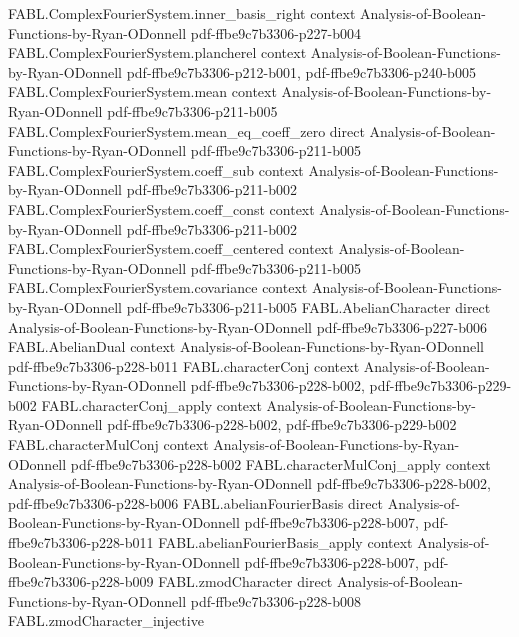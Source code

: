 \begin{theorem}
\proofstep
  {FABL.ComplexFourierSystem.inner_basis_right}
  {context}
  {Analysis-of-Boolean-Functions-by-Ryan-ODonnell}
  {pdf-ffbe9c7b3306-p227-b004}
\proofstep
  {FABL.ComplexFourierSystem.plancherel}
  {context}
  {Analysis-of-Boolean-Functions-by-Ryan-ODonnell}
  {pdf-ffbe9c7b3306-p212-b001,
    pdf-ffbe9c7b3306-p240-b005}
\proofstep
  {FABL.ComplexFourierSystem.mean}
  {context}
  {Analysis-of-Boolean-Functions-by-Ryan-ODonnell}
  {pdf-ffbe9c7b3306-p211-b005}
\proofstep
  {FABL.ComplexFourierSystem.mean_eq_coeff_zero}
  {direct}
  {Analysis-of-Boolean-Functions-by-Ryan-ODonnell}
  {pdf-ffbe9c7b3306-p211-b005}
\proofstep
  {FABL.ComplexFourierSystem.coeff_sub}
  {context}
  {Analysis-of-Boolean-Functions-by-Ryan-ODonnell}
  {pdf-ffbe9c7b3306-p211-b002}
\proofstep
  {FABL.ComplexFourierSystem.coeff_const}
  {context}
  {Analysis-of-Boolean-Functions-by-Ryan-ODonnell}
  {pdf-ffbe9c7b3306-p211-b002}
\proofstep
  {FABL.ComplexFourierSystem.coeff_centered}
  {context}
  {Analysis-of-Boolean-Functions-by-Ryan-ODonnell}
  {pdf-ffbe9c7b3306-p211-b005}
\proofstep
  {FABL.ComplexFourierSystem.covariance}
  {context}
  {Analysis-of-Boolean-Functions-by-Ryan-ODonnell}
  {pdf-ffbe9c7b3306-p211-b005}
\proofstep
  {FABL.AbelianCharacter}
  {direct}
  {Analysis-of-Boolean-Functions-by-Ryan-ODonnell}
  {pdf-ffbe9c7b3306-p227-b006}
\proofstep
  {FABL.AbelianDual}
  {context}
  {Analysis-of-Boolean-Functions-by-Ryan-ODonnell}
  {pdf-ffbe9c7b3306-p228-b011}
\proofstep
  {FABL.characterConj}
  {context}
  {Analysis-of-Boolean-Functions-by-Ryan-ODonnell}
  {pdf-ffbe9c7b3306-p228-b002,
    pdf-ffbe9c7b3306-p229-b002}
\proofstep
  {FABL.characterConj_apply}
  {context}
  {Analysis-of-Boolean-Functions-by-Ryan-ODonnell}
  {pdf-ffbe9c7b3306-p228-b002,
    pdf-ffbe9c7b3306-p229-b002}
\proofstep
  {FABL.characterMulConj}
  {context}
  {Analysis-of-Boolean-Functions-by-Ryan-ODonnell}
  {pdf-ffbe9c7b3306-p228-b002}
\proofstep
  {FABL.characterMulConj_apply}
  {context}
  {Analysis-of-Boolean-Functions-by-Ryan-ODonnell}
  {pdf-ffbe9c7b3306-p228-b002,
    pdf-ffbe9c7b3306-p228-b006}
\proofstep
  {FABL.abelianFourierBasis}
  {direct}
  {Analysis-of-Boolean-Functions-by-Ryan-ODonnell}
  {pdf-ffbe9c7b3306-p228-b007,
    pdf-ffbe9c7b3306-p228-b011}
\proofstep
  {FABL.abelianFourierBasis_apply}
  {context}
  {Analysis-of-Boolean-Functions-by-Ryan-ODonnell}
  {pdf-ffbe9c7b3306-p228-b007,
    pdf-ffbe9c7b3306-p228-b009}
\proofstep
  {FABL.zmodCharacter}
  {direct}
  {Analysis-of-Boolean-Functions-by-Ryan-ODonnell}
  {pdf-ffbe9c7b3306-p228-b008}
\proofstep
  {FABL.zmodCharacter_injective}

\end{theorem}
